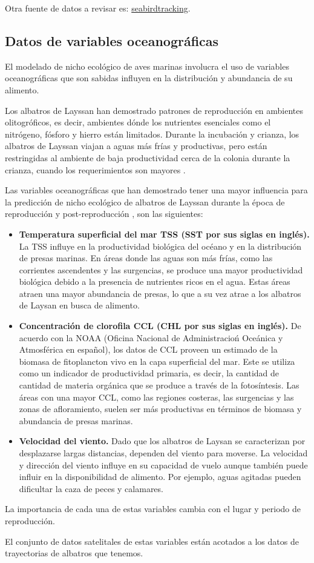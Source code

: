 Otra fuente de datos a revisar es:
\href{https://data.seabirdtracking.org/dataset/1928}{seabirdtracking}.

\subsection*{Datos de variables oceanográficas}

El modelado de nicho ecológico de aves marinas involucra el uso de variables
oceanográficas que son sabidas influyen en la distribución y abundancia de su
alimento. 

Los albatros de Layssan han demostrado patrones de reproducción en ambientes
olitogróficos, es decir, ambientes dónde los nutrientes esenciales como el
nitrógeno, fósforo y hierro están limitados. Durante la incubación y crianza,
los albatros de Layssan viajan a aguas más frías y productivas, pero están
restringidas al ambiente de baja productividad cerca de la colonia durante la
crianza, cuando los requerimientos son mayores \cite{kappes2015reproductive}.

Las variables oceanográficas que han demostrado tener una mayor influencia para
la predicción de nicho ecológico de albatros de Layssan durante la época de
reproducción y post-reproducción \cite{henry2021successful}, son las siguientes:

\begin{itemize}
    \item \textbf{Temperatura superficial del mar TSS (SST por sus siglas en
    inglés).} La TSS influye en la productividad biológica del océano y en la
    distribución de presas marinas. En áreas donde las aguas son más frías, como
    las corrientes ascendentes y las surgencias, se produce una mayor
    productividad biológica debido a la presencia de nutrientes ricos en el
    agua. Estas áreas atraen una mayor abundancia de presas, lo que a su vez
    atrae a los albatros de Laysan en busca de alimento.

    \item \textbf{Concentración de clorofila CCL (CHL por sus siglas en
    inglés).} De acuerdo con la NOAA (Oficina Nacional de Administracioń
    Oceánica y Atmosférica en español), los datos de CCL proveen un estimado de
    la biomasa de fitoplancton vivo en la capa superficial del mar. Este se
    utiliza como un indicador de productividad primaria, es decir, la cantidad
    de cantidad de materia orgánica que se produce a través de la fotosíntesis.
    Las áreas con una mayor CCL, como las regiones costeras, las surgencias y
    las zonas de afloramiento, suelen ser más productivas en términos de biomasa
    y abundancia de presas marinas.

    \item \textbf{Velocidad del viento.} Dado que los albatros de Laysan se
    caracterizan por desplazarse largas distancias, dependen del viento para
    moverse. La velocidad y dirección del viento influye en su capacidad de
    vuelo aunque también puede influir en la disponibilidad de alimento. Por
    ejemplo, aguas agitadas pueden dificultar la caza de peces y calamares.

\end{itemize}

La importancia de cada una de estas variables cambia con el lugar y periodo de
reproducción.

El conjunto de datos satelitales de estas variables están acotados a los datos
de trayectorias de albatros que tenemos.
